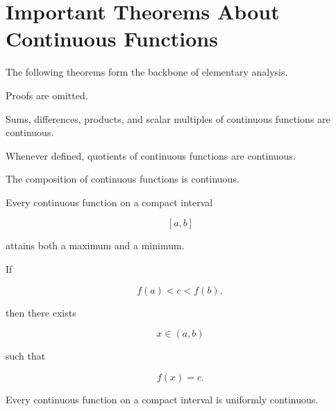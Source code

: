 \documentclass{essay}
\begin{document}
\section{Important Theorems About Continuous Functions}

The following theorems form the backbone of elementary analysis.

Proofs are omitted.

\begin{theorem}

  Sums, differences, products, and scalar multiples of continuous functions are
  continuous.

  Whenever defined, quotients of continuous functions are continuous.

\end{theorem}

\begin{theorem}[Composition]

  The composition of continuous functions is continuous.

\end{theorem}

\begin{theorem}

  Every continuous function on a compact interval

  \[ [a,b] \]

  attains both a maximum and a minimum.

\end{theorem}

\begin{theorem}

  If

  \[ f(a)<c<f(b), \]

  then there exists

  \[ x\in(a,b) \]

  such that

  \[ f(x)=c. \]

\end{theorem}

\begin{theorem}

  Every continuous function on a compact interval is uniformly continuous.

\end{theorem}

\end{document}
